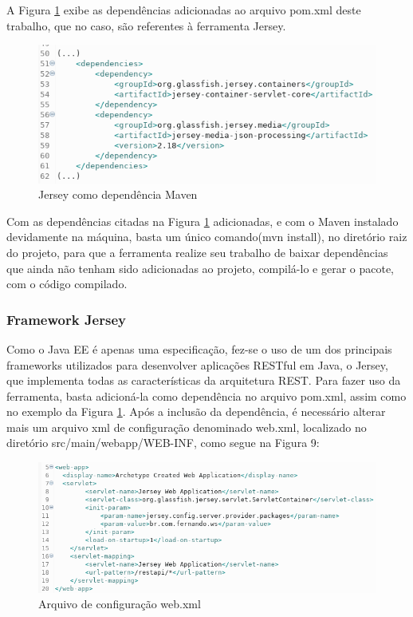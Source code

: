 \documentclass[12pt]{article}
\begin{document}
A Figura \ref{fig:Figura5} exibe as dependências adicionadas ao arquivo pom.xml deste trabalho, que no caso, são referentes à ferramenta Jersey.
\begin{figure}[ht]
	\centering
	\includegraphics[width=.9\textwidth]{jersey-pom.png}
	\caption{Jersey como dependência Maven}
	\label{fig:Figura5}
\end{figure}


Com as dependências citadas na Figura \ref{fig:Figura5} adicionadas, e com o Maven instalado devidamente na máquina, basta um único comando(mvn install), no diretório raiz do projeto, para que a ferramenta realize seu trabalho de baixar dependências que ainda não tenham sido adicionadas ao projeto, compilá-lo e gerar o pacote, com o código compilado.

\subsubsection{Framework Jersey}

Como o Java EE é apenas uma especificação, fez-se o uso de um dos principais frameworks utilizados para desenvolver aplicações RESTful em Java, o Jersey, que implementa todas as características da arquitetura REST. Para fazer uso da ferramenta, basta adicioná-la como dependência no arquivo pom.xml, assim como no exemplo da Figura \ref{fig:Figura5}. Após a inclusão da dependência, é necessário alterar mais um arquivo xml de configuração denominado web.xml, localizado no diretório src/main/webapp/WEB-INF, como segue na Figura 9:

\begin{figure}[ht]
	\centering
	\includegraphics[width=.9\textwidth]{web-xml.png}
	\caption{Arquivo de configuração web.xml}
	\label{fig:Figura9}
\end{figure}
\end{document}
